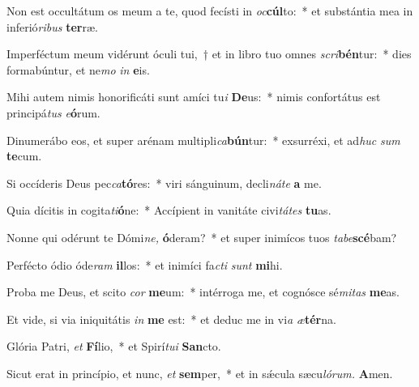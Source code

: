 \item Non est occultátum os meum a te, quod fecísti in \textit{oc}\textbf{cúl}to:~* et substántia mea in inferió\textit{ribus} \textbf{ter}ræ.
\item Imperféctum meum vidérunt óculi tui,~† et in libro tuo omnes \textit{scri}\textbf{bén}tur:~* dies formabúntur, et ne\textit{mo} \textit{in} \textbf{e}is.
\item Mihi autem nimis honorificáti sunt amíci tu\tinyhspace\textit{i} \textbf{De}us:~* nimis confortátus est principá\tinyhspace\textit{tus} \textit{e}\textbf{ó}rum.
\item Dinumerábo eos, et super arénam multipli\tinyhspace\textit{ca}\textbf{bún}tur:~* exsurréxi, et ad\textit{huc} \textit{sum} \textbf{te}cum.
\item Si occíderis Deus pec\textit{ca}\textbf{tó}res:~* viri sánguinum, decli\textit{náte} \textbf{a} me.
\item Quia dícitis in cogita\tinyhspace\textit{ti}\textbf{ó}ne:~* Accípient in vanitáte civi\textit{tátes} \textbf{tu}as.
\item Nonne qui odérunt te Dómi\textit{ne,} \textbf{ó}deram?~* et super inimícos tuos \textit{tabe}\textbf{scé}bam?
\item Perfécto ódio óde\textit{ram} \textbf{il}los:~* et inimíci fa\tinyhspace\textit{cti} \textit{sunt} \textbf{mi}hi.
\item Proba me Deus, et scito \textit{cor} \textbf{me}um:~* intérroga me, et cognósce sé\textit{mitas} \textbf{me}as.
\item Et vide, si via iniquitátis \textit{in} \textbf{me} est:~* et deduc me in vi\tinyhspace\textit{a} \textit{æ}\textbf{tér}na.
\item Glória Patri, \textit{et} \textbf{Fí}lio,~* et Spirí\tinyhspace\textit{tui} \textbf{San}cto.
\item Sicut erat in princípio, et nunc, \textit{et} \textbf{sem}per,~* et in sǽcula sæcu\tinyhspace\textit{lórum.} \textbf{A}men.
